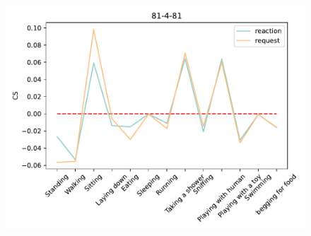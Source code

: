 \begin{figure}[ht]
\begin{minipage}[b]{.3\linewidth}
		\includegraphics[width=0.99\linewidth]{./35word/81-4-81.pdf}
	\end{minipage}
	

\end{figure}
